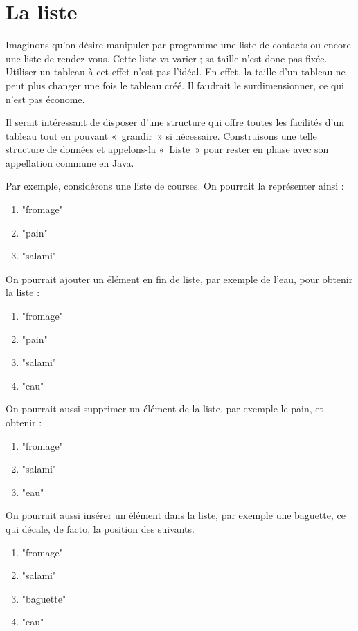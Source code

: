 \chapter{La liste}

	
	Imaginons qu’on désire manipuler par programme une liste de contacts ou
	encore une liste de rendez-vous. Cette liste va varier ; sa taille
	n’est donc pas fixée. Utiliser un tableau à cet effet n’est pas l’idéal. 
	En effet, la taille d’un tableau ne peut plus changer une fois le tableau créé. 
	Il faudrait le surdimensionner, ce qui n’est pas économe.
	
	Il serait intéressant de disposer d’une structure qui offre toutes les
	facilités d’un tableau tout en pouvant «~grandir~» si nécessaire.
	Construisons une telle structure de données et appelons-la «~Liste~»
	pour rester en phase avec son appellation commune en Java.
	
	Par exemple, considérons une liste de courses.
	On pourrait la représenter ainsi :
	\begin{enumerate}
	\item "fromage"
	\item "pain"
	\item "salami"
	\end{enumerate}
	
	On pourrait ajouter un élément en fin de liste, par exemple de l'eau,
	pour obtenir la liste :
	
	\begin{enumerate}
	\item "fromage"
	\item "pain"
	\item "salami"
	\item "eau"
	\end{enumerate}
	
	On pourrait aussi supprimer un élément de la liste, par exemple le pain,
	et obtenir :
	
	\begin{enumerate}
	\item "fromage"
	\item "salami"
	\item "eau"
	\end{enumerate}
	
	On pourrait aussi insérer un élément dans la liste, 
	par exemple une baguette, 
	ce qui décale, de facto, la position des suivants.
	
	\begin{enumerate}
	\item "fromage"
	\item "salami"
	\item "baguette"
	\item "eau"
	\end{enumerate}
	
